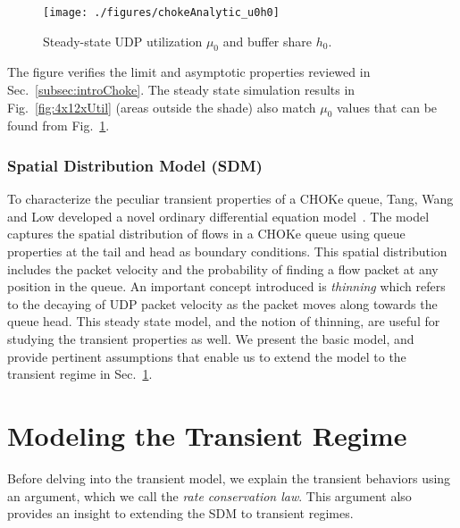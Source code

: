 \documentclass{IEEEtran}
\begin{document}
          \begin{figure}[h]
            \centering
            \texttt{[image: ./figures/chokeAnalytic\_u0h0]}\caption{Steady-state UDP utilization $\mu_0$ and buffer share $h_0$.}
            \label{fig:olm-steadystate}
      \end{figure}

      The figure verifies the limit and asymptotic properties reviewed in Sec.~\ref{subsec:introChoke}. The  steady state simulation results in Fig.~\ref{fig:4x12xUtil} (areas outside the shade) also match $\mu_0$ values that can be found from Fig.~\ref{fig:olm-steadystate}.

    \subsubsection{Spatial Distribution Model (SDM)}
        To characterize the peculiar transient properties of a CHOKe queue, Tang, Wang and Low developed a novel ordinary differential equation model~\cite{ChokeToN04}. The model captures the spatial distribution of flows in a CHOKe queue using queue properties at the tail and head as boundary conditions. This spatial distribution includes the packet velocity and the probability of finding a flow packet at any position in the queue. An important concept introduced is \emph{thinning} which refers to the decaying of UDP packet velocity as the packet moves along towards the queue head. This steady state model, and the notion of thinning, are useful for studying the transient properties as well. We present the basic model, and provide pertinent assumptions that enable us to extend the model to the transient regime in Sec.~\ref{sec:modifiedSDM}.


    \section{Modeling the Transient Regime}\label{sec:modifiedSDM}
    Before delving into the transient model, we explain the transient behaviors using an argument, which we call the \emph{rate conservation law}. This argument also provides an insight to extending the SDM to transient regimes.
\end{document}
